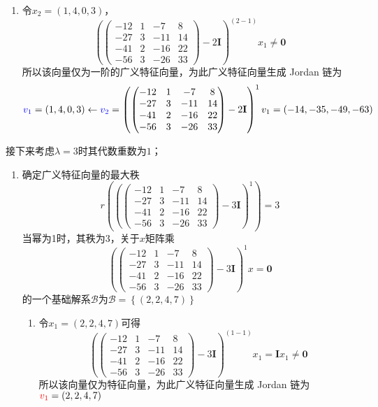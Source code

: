 \begin{example}
\begin{enumerate}
\begin{enumerate}
		\item 令$x_2=(1,4,0,3)$，$$\left( \begin{pmatrix}
	-12 & 1 & -7 & 8\\
	-27 & 3 & -11 & 14\\
	-41 & 2 & -16 & 22\\
	-56 & 3 & -26 & 33
	\end{pmatrix}-2\mathbf{I} \right)^{(2-1)}x_1\neq \boldsymbol{0}$$所以该向量仅为一阶的广义特征向量，为此广义特征向量生成 Jordan 链为$$\textcolor{blue}{v_1}=(1,4,0,3)\leftarrow \textcolor{blue}{v_2}=\left( \begin{pmatrix}
	-12 & 1 & -7 & 8\\
	-27 & 3 & -11 & 14\\
	-41 & 2 & -16 & 22\\
	-56 & 3 & -26 & 33
	\end{pmatrix}-2\mathbf{I} \right)^1v_1=(-14,-35,-49,-63)$$
	\end{enumerate}
\end{enumerate}

\vspace{1em}

接下来考虑$\lambda=3$时其代数重数为$1$；

\begin{enumerate}
	\item 确定广义特征向量的最大秩$$r\left( \left( \begin{pmatrix}
	-12 & 1 & -7 & 8\\
	-27 & 3 & -11 & 14\\
	-41 & 2 & -16 & 22\\
	-56 & 3 & -26 & 33
	\end{pmatrix}-3\mathbf{I} \right)^1 \right)=3$$当幂为1时，其秩为3，关于$x$矩阵乘$$\left( \begin{pmatrix}
	-12 & 1 & -7 & 8\\
	-27 & 3 & -11 & 14\\
	-41 & 2 & -16 & 22\\
	-56 & 3 & -26 & 33
	\end{pmatrix}-3\mathbf{I} \right)^1x=\boldsymbol{0}$$的一个基础解系$\mathcal{B}$为$\mathcal{B}=\left\{ (2,2,4,7) \right\}$
	\begin{enumerate}
		\item 令$x_1=(2,2,4,7)$可得$$\left( \begin{pmatrix}
	-12 & 1 & -7 & 8\\
	-27 & 3 & -11 & 14\\
	-41 & 2 & -16 & 22\\
	-56 & 3 & -26 & 33
	\end{pmatrix}-3\mathbf{I} \right)^{(1-1)}x_1=\mathbf{I}x_1\neq \boldsymbol{0}$$所以该向量仅为特征向量，为此广义特征向量生成 Jordan 链为$\textcolor{red}{v_1}=(2,2,4,7)$
	\end{enumerate}
\end{enumerate}
\vspace{1em}


\end{example}

